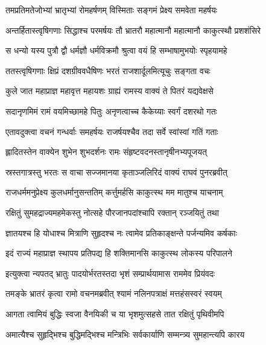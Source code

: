 
\twolineshloka
{तमप्रतिमतेजोभ्यां भ्रातृभ्यां रोमहर्षणम्}
{विस्मिताः सङ्गमं प्रेक्ष्य समवेता महर्षयः} %

\twolineshloka
{अन्तर्हितास्त्वृषिगणाः सिद्धाश्च परमर्षयः}
{तौ भ्रातरौ महात्मानौ महात्मानौ काकुत्स्थौ प्रशशंसिरे} %

\twolineshloka
{स धन्यो यस्य पुत्रौ द्वौ धर्मज्ञौ धर्मविक्रमौ}
{श्रुत्वा वयं हि सम्भाषामुभयोः स्पृहयामहे} %

\twolineshloka
{ततस्त्वृषिगणाः क्षिप्रं दशग्रीववधैषिणः}
{भरतं राजशार्दूलमित्यूचुः सङ्गता वचः} %

\twolineshloka
{कुले जात महाप्राज्ञ महावृत्त महायशः}
{ग्राह्यं रामस्य वाक्यं ते पितरं यद्यवेक्षसे} %

\twolineshloka
{सदानृणमिमं रामं वयमिच्छामहे पितुः}
{अनृणत्वाच्च कैकेय्याः स्वर्गं दशरथो गतः} %

\twolineshloka
{एतावदुक्त्वा वचनं गन्धर्वाः समहर्षयः}
{राजर्षयश्चैव तदा सर्वे स्वांस्वां गतिं गताः} %

\twolineshloka
{ह्लादितस्तेन वाक्येन शुभेन शुभदर्शनः}
{रामः संहृष्टवदनस्तानृषीनभ्यपूजयत्} %

\twolineshloka
{स्रस्तगात्रस्तु भरतः स वाचा सज्जमानया}
{कृताञ्जलिरिदं वाक्यं राघवं पुनरब्रवीत्} %

\twolineshloka
{राजधर्ममनुप्रेक्ष्य कुलधर्मानुसन्ततिम्}
{कर्त्तुमर्हसि काकुत्स्थ मम मातुश्च याचनाम्} %

\twolineshloka
{रक्षितुं सुमहद्राज्यमहमेकस्तु नोत्सहे}
{पौरजानपदांश्चापि रक्तान् रञ्जयितुं तथा} %

\twolineshloka
{ज्ञातयश्च हि योधाश्च मित्राणि सुहृदश्च नः}
{त्वामेव प्रतिकाङ्क्षन्ते पर्जन्यमिव कर्षकाः} %

\twolineshloka
{इदं राज्यं महाप्राज्ञ स्थापय प्रतिपद्य हि}
{शक्तिमानसि काकुत्स्थ लोकस्य परिपालने} %

\twolineshloka
{इत्युक्त्वा न्यपतद् भ्रातुः पादयोर्भरतस्तदा}
{भृशं सम्प्रार्थयामास राममेव प्रियंवदः} %

\twolineshloka
{तमङ्के भ्रातरं कृत्वा रामो वचनमब्रवीत्}
{श्यामं नलिनपत्राक्षं मत्तहंसस्वरं स्वयम्} %

\twolineshloka
{आगता त्वामियं बुद्धिः स्वजा वैनयिकी च या}
{भृशमुत्सहसे तात रक्षितुं पृथिवीमपि} %

\twolineshloka
{अमात्यैश्च सुहृद्भिश्च बुद्धिमद्भिश्च मन्त्रिभिः}
{सर्वकार्याणि सम्मन्त्र्य सुमहान्त्यपि कारय} %

